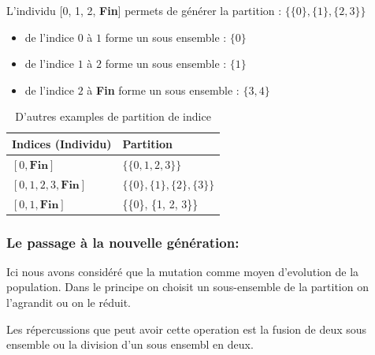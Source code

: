 \documentclass[runningheads]{llncs}
\begin{document}
L'individu [0, 1, 2, \textbf{Fin}] permets de générer la partition :  $\{\{0\}, \{1\}, \{2, 3\}\}$
\begin{itemize}
    \item de l'indice $0$ \`a $1$ forme un sous ensemble : $\{0\}$
    \item de l'indice $1$ \`a $2$ forme un sous ensemble : $\{1\}$
    \item de l'indice $2$ \`a \textbf{Fin} forme un sous ensemble : $\{3, 4\}$
\end{itemize}
\begin{table}[H]
\centering
\caption{D'autres examples de partition de indice}\label{tab1}
\begin{tabular}{|l|l|}
\hline
Indices (Individu) &  Partition \\
\hline
$[0, \textbf{Fin}]$&  $\{\{0, 1, 2, 3\}\}$\\
$[0,1, 2, 3, \textbf{Fin}]$ & $\{\{0\}, \{1\}, \{2\}, \{3\}\}$\\
$[0,1, \textbf{Fin}]$ & \{\{0\}, \{1, 2, 3\}\}\\
\hline
\end{tabular}
\end{table}

\subsubsection{Le passage à la nouvelle génération:}
Ici nous avons considéré que la mutation comme moyen 
d'evolution de la population. Dans le principe on choisit 
un sous-ensemble de la partition on l'agrandit ou on le réduit.

Les répercussions que peut avoir cette operation est la fusion de 
deux sous ensemble ou la division d'un sous ensembl en deux.
\end{document}
